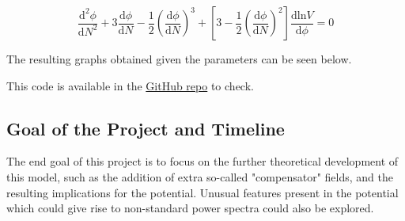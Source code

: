 \documentclass[aps,prd,reprint,preprintnumbers,showpacs,floatfix,nofootinbib,superscript address]{revtex4-2}
\begin{document}
\begin{equation}
    \frac{\mathrm{d}^2\phi}{\mathrm{d}N^2} + 3 \frac{\mathrm{d}\phi}{\mathrm{d}N} - \frac{1}{2} \left( \frac{\mathrm{d}\phi}{\mathrm{d}N} \right)^3 + \left[ 3 - \frac{1}{2} \left( \frac{\mathrm{d}\phi}{\mathrm{d}N} \right)^2 \right] \frac{\mathrm{d}\text{ln}V}{\mathrm{d}\phi}  = 0
\end{equation}

The resulting graphs obtained given the parameters can be seen below. 

This code is available in the \href{https://github.com/PrabhodaCS/Part-III-Inflation-Project}{GitHub repo} to check.

\newpage

\subsection{Goal of the Project and Timeline}

The end goal of this project is to focus on the further theoretical development of this model, such as the addition of extra so-called "compensator" fields, and the resulting implications for the potential. Unusual features present in the potential which could give rise to non-standard power spectra could also be explored. 
\end{document}
